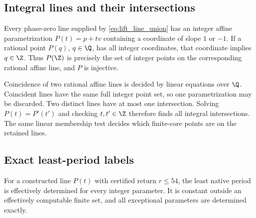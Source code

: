 \subsection{Integral lines and their intersections}

Every phase-zero line supplied by
\eqref{eq:lift_line_union} has an integer affine parametrization
\(P(t)=p+tv\) containing a coordinate of slope \(1\) or \(-1\).
If a rational point \(P(q)\), \(q\in\Q\), has all integer
coordinates, that coordinate implies \(q\in\Z\). Thus \(P(\Z)\)
is precisely the set of integer points on the corresponding rational
affine line, and \(P\) is injective.

Coincidence of two rational affine lines is decided by linear equations
over \(\Q\). Coincident lines have the same full integer point set,
so one parametrization may be discarded. Two distinct lines have at
most one intersection. Solving
\(P(t)=P'(t')\) and checking \(t,t'\in\Z\) therefore finds all
integral intersections. The same linear membership test decides which
finite-core points are on the retained lines.

\subsection{Exact least-period labels}

\begin{proposition}\label{prop:periods}
For a constructed line \(P(t)\) with certified return \(r\le54\),
the least native period is effectively determined for every integer
parameter. It is constant outside an effectively computable finite
set, and all exceptional parameters are determined exactly.
\end{proposition}

